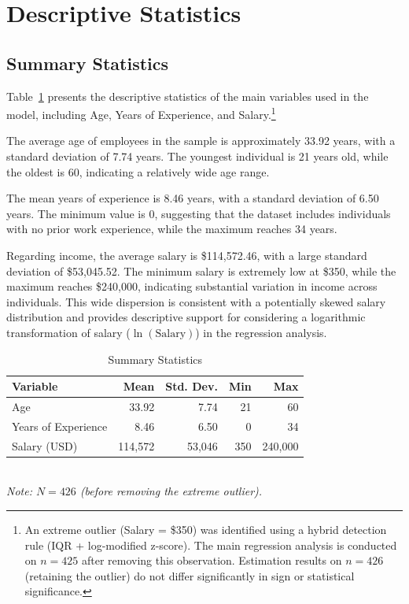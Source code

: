 \documentclass[12pt, a4paper]{article}
\begin{document}
\section{Descriptive Statistics}

\subsection{Summary Statistics}
Table~\ref{tab:summary} presents the descriptive statistics of the main variables used in the model, including Age, Years of Experience, and Salary.\footnote{An extreme outlier (Salary = \$350) was identified using a hybrid detection rule (IQR + log-modified z-score). The main regression analysis is conducted on $n = 425$ after removing this observation. Estimation results on $n = 426$ (retaining the outlier) do not differ significantly in sign or statistical significance.}

The average age of employees in the sample is approximately 33.92 years, with a standard deviation of 7.74 years. The youngest individual is 21 years old, while the oldest is 60, indicating a relatively wide age range.

The mean years of experience is 8.46 years, with a standard deviation of 6.50 years. The minimum value is 0, suggesting that the dataset includes individuals with no prior work experience, while the maximum reaches 34 years.

Regarding income, the average salary is \$114,572.46, with a large standard deviation of \$53,045.52. The minimum salary is extremely low at \$350, while the maximum reaches \$240,000, indicating substantial variation in income across individuals. This wide dispersion is consistent with a potentially skewed salary distribution and provides descriptive support for considering a logarithmic transformation of salary (\(\ln(\text{Salary})\)) in the regression analysis.

\begin{table}[htpb]
\centering
\caption{Summary Statistics}
\label{tab:summary}
\begin{tabular}{lrrrr}
\toprule
\textbf{Variable} & \textbf{Mean} & \textbf{Std. Dev.} & \textbf{Min} & \textbf{Max} \\
\midrule
Age & 33.92 & 7.74 & 21 & 60 \\
Years of Experience & 8.46 & 6.50 & 0 & 34 \\
Salary (USD) & 114,572 & 53,046 & 350 & 240,000 \\
\bottomrule
\end{tabular}
\\[1ex]
\textit{\small Note: \(N = 426\) (before removing the extreme outlier).}
\end{table}
\end{document}
